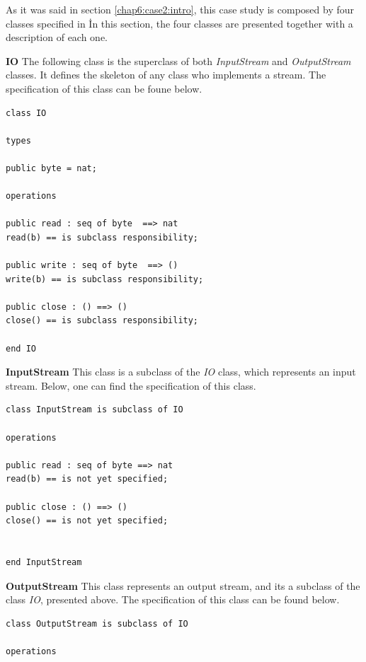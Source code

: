 As it was said in section \ref{chap6:case2:intro}, this case study is composed by four classes specified in \vpp\. In this section, the four classes are presented together with a description of each one.

\begin{description}

\item{\textbf{IO}} The following class is the superclass of both \textit{InputStream} and \textit{OutputStream} classes. It defines the skeleton of any class who implements a stream. The specification of this class can be foune below.

\lstset{style=mystyle}
\bigskip
\begin{lstlisting}
class IO

types

public byte = nat;

operations 

public read : seq of byte  ==> nat
read(b) == is subclass responsibility;

public write : seq of byte  ==> ()
write(b) == is subclass responsibility;

public close : () ==> ()
close() == is subclass responsibility;

end IO
\end{lstlisting}
\bigskip

\item{\textbf{InputStream}} This class is a subclass of the \textit{IO} class, which represents an input stream. Below, one can find the specification of this class.

\bigskip
\begin{lstlisting}
class InputStream is subclass of IO

operations

public read : seq of byte ==> nat
read(b) == is not yet specified;

public close : () ==> ()
close() == is not yet specified;


end InputStream
\end{lstlisting}
\bigskip

\item{\textbf{OutputStream}} This class represents an output stream, and its a subclass of the class \textit{IO}, presented above. The specification of this class can be found below.

\bigskip
\begin{lstlisting}
class OutputStream is subclass of IO

operations


\end{lstlisting}
\end{description}
